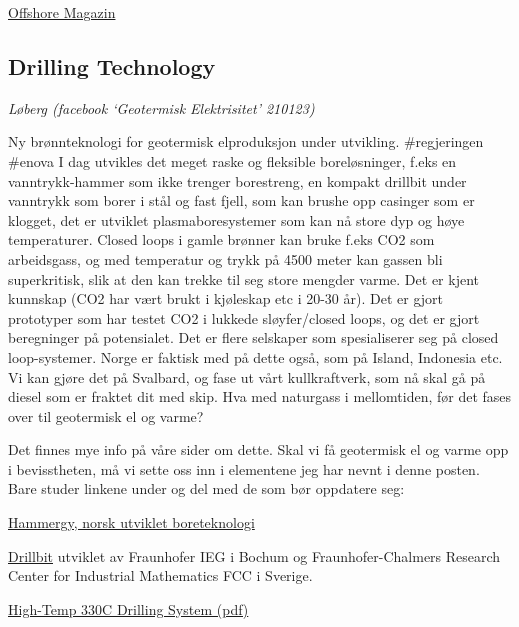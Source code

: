 \documentclass[
]{book}
\begin{document}
\href{https://www.offshore-mag.com/pipelines/article/16762144/geothermal-power-an-alternate-role-for-redundant-north-sea-platforms}{Offshore Magazin}

\hypertarget{drilling-technology}{%
\subsection{Drilling Technology}\label{drilling-technology}}

\emph{Løberg (facebook `Geotermisk Elektrisitet' 210123)}

Ny brønnteknologi for geotermisk elproduksjon under utvikling. \#regjeringen \#enova I dag utvikles det meget raske og fleksible boreløsninger, f.eks en vanntrykk-hammer som ikke trenger borestreng, en kompakt drillbit under vanntrykk som borer i stål og fast fjell, som kan brushe opp casinger som er klogget, det er utviklet plasmaboresystemer som kan nå store dyp og høye temperaturer. Closed loops i gamle brønner kan bruke f.eks CO2 som arbeidsgass, og med temperatur og trykk på 4500 meter kan gassen bli superkritisk, slik at den kan trekke til seg store mengder varme. Det er kjent kunnskap (CO2 har vært brukt i kjøleskap etc i 20-30 år). Det er gjort prototyper som har testet CO2 i lukkede sløyfer/closed loops, og det er gjort beregninger på potensialet. Det er flere selskaper som spesialiserer seg på closed loop-systemer. Norge er faktisk med på dette også, som på Island, Indonesia etc. Vi kan gjøre det på Svalbard, og fase ut vårt kullkraftverk, som nå skal gå på diesel som er fraktet dit med skip. Hva med naturgass i mellomtiden, før det fases over til geotermisk el og varme?

Det finnes mye info på våre sider om dette. Skal vi få geotermisk el og varme opp i bevisstheten, må vi sette oss inn i elementene jeg har nevnt i denne posten. Bare studer linkene under og del med de som bør oppdatere seg:

\href{https://www.tu.no/artikler/den-norske-oppfinneren-har-en-visjon-om-at-kinesiske-kullkraftverk-kan-bygges-om-til-geotermiske-kraftverk/376346}{Hammergy, norsk utviklet boreteknologi}

\href{https://techxplore.com/news/2022-01-micro-drilling-turbines-efficiency-geothermal.html}{Drillbit} utviklet av Fraunhofer IEG i Bochum og Fraunhofer-Chalmers Research Center for Industrial Mathematics FCC i Sverige.

\href{pdf/high_macpherson_ht_directional_drilling.pdf}{High-Temp 330C Drilling System (pdf)}
\end{document}
